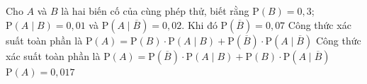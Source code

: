 \begin{ex}%
	Cho $A$ và $B$ là hai biến cố  của cùng phép thử, biết rằng $\mathrm{P}(B)=0{,}3$;\break $\mathrm{P}(A\mid B)=0{,}01$ và $\mathrm{P}\left(A\mid \overline{B}\right)=0{,}02$. Khi đó
	 \choiceTF
		 {$\mathrm{P}\left(\overline{B}\right)=0{,}07$}
		{\True Công thức xác suất toàn phần là $\mathrm{P}(A)=\mathrm{P}(B) \cdot  \mathrm{P}(A\mid B)+\mathrm{P}\left(\overline{B} \right) \cdot \mathrm{P}\left(A\mid \overline{B} \right)$}
		{Công thức xác suất toàn phần là $\mathrm{P}(A)=\mathrm{P}(\overline{B})  \cdot \mathrm{P}(A\mid B)+\mathrm{P}(B) \cdot \mathrm{P}\left(A\mid \overline{B} \right)$}
		{\True $\mathrm{P}(A)=0{,}017$} 
\end{ex}

